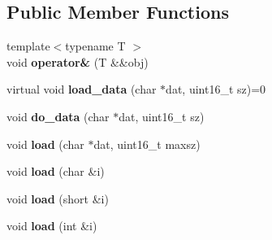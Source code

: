 \subsection*{Public Member Functions}
\begin{DoxyCompactItemize}
\item 
{\footnotesize template$<$typename T $>$ }\\void {\bfseries operator\&} (T \&\&obj)\hypertarget{classgxx_1_1archive_1_1binary__deserializer__basic_a5bf9567e3c11621c442b0fb4f00a46b1}{}\label{classgxx_1_1archive_1_1binary__deserializer__basic_a5bf9567e3c11621c442b0fb4f00a46b1}

\item 
virtual void {\bfseries load\+\_\+data} (char $\ast$dat, uint16\+\_\+t sz)=0\hypertarget{classgxx_1_1archive_1_1binary__deserializer__basic_aabcb28260ba2724420125e3b397b5ce7}{}\label{classgxx_1_1archive_1_1binary__deserializer__basic_aabcb28260ba2724420125e3b397b5ce7}

\item 
void {\bfseries do\+\_\+data} (char $\ast$dat, uint16\+\_\+t sz)\hypertarget{classgxx_1_1archive_1_1binary__deserializer__basic_adee825c6ee4e1f532a82feb183cd54a8}{}\label{classgxx_1_1archive_1_1binary__deserializer__basic_adee825c6ee4e1f532a82feb183cd54a8}

\item 
void {\bfseries load} (char $\ast$dat, uint16\+\_\+t maxsz)\hypertarget{classgxx_1_1archive_1_1binary__deserializer__basic_aa528759587f412e22f7e8cd023e4adf0}{}\label{classgxx_1_1archive_1_1binary__deserializer__basic_aa528759587f412e22f7e8cd023e4adf0}

\item 
void {\bfseries load} (char \&i)\hypertarget{classgxx_1_1archive_1_1binary__deserializer__basic_a0835910d47a138f8bf64f7928afec0fa}{}\label{classgxx_1_1archive_1_1binary__deserializer__basic_a0835910d47a138f8bf64f7928afec0fa}

\item 
void {\bfseries load} (short \&i)\hypertarget{classgxx_1_1archive_1_1binary__deserializer__basic_aadce970dc3f550e0c5bebedf6740b1a8}{}\label{classgxx_1_1archive_1_1binary__deserializer__basic_aadce970dc3f550e0c5bebedf6740b1a8}

\item 
void {\bfseries load} (int \&i)\hypertarget{classgxx_1_1archive_1_1binary__deserializer__basic_a88bfb7e4840592801788cf0f31d8e76e}{}\label{classgxx_1_1archive_1_1binary__deserializer__basic_a88bfb7e4840592801788cf0f31d8e76e}


\end{DoxyCompactItemize}
